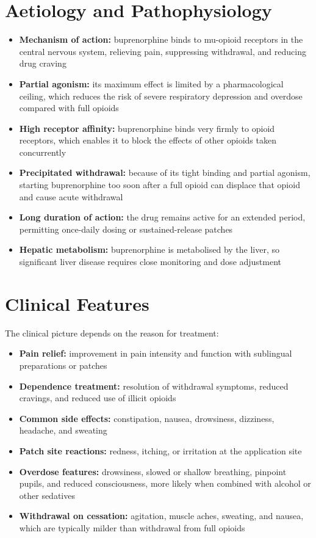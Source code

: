 \section*{Aetiology and Pathophysiology}
\begin{itemize}
    \item \textbf{Mechanism of action:} buprenorphine binds to mu-opioid receptors in the central nervous system, relieving pain, suppressing withdrawal, and reducing drug craving
    \item \textbf{Partial agonism:} its maximum effect is limited by a pharmacological ceiling, which reduces the risk of severe respiratory depression and overdose compared with full opioids
    \item \textbf{High receptor affinity:} buprenorphine binds very firmly to opioid receptors, which enables it to block the effects of other opioids taken concurrently
    \item \textbf{Precipitated withdrawal:} because of its tight binding and partial agonism, starting buprenorphine too soon after a full opioid can displace that opioid and cause acute withdrawal
    \item \textbf{Long duration of action:} the drug remains active for an extended period, permitting once-daily dosing or sustained-release patches
    \item \textbf{Hepatic metabolism:} buprenorphine is metabolised by the liver, so significant liver disease requires close monitoring and dose adjustment
\end{itemize}

\section*{Clinical Features}
The clinical picture depends on the reason for treatment:
\begin{itemize}
    \item \textbf{Pain relief:} improvement in pain intensity and function with sublingual preparations or patches
    \item \textbf{Dependence treatment:} resolution of withdrawal symptoms, reduced cravings, and reduced use of illicit opioids
    \item \textbf{Common side effects:} constipation, nausea, drowsiness, dizziness, headache, and sweating
    \item \textbf{Patch site reactions:} redness, itching, or irritation at the application site
    \item \textbf{Overdose features:} drowsiness, slowed or shallow breathing, pinpoint pupils, and reduced consciousness, more likely when combined with alcohol or other sedatives
    \item \textbf{Withdrawal on cessation:} agitation, muscle aches, sweating, and nausea, which are typically milder than withdrawal from full opioids
\end{itemize}

